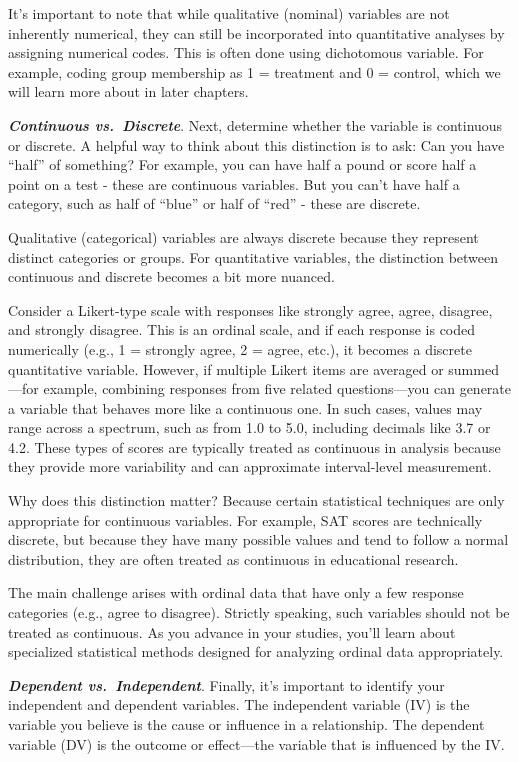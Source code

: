 \documentclass[
  letterpaper,
  DIV=11,
  numbers=noendperiod]{scrreprt}
\begin{document}
It's important to note that while qualitative (nominal) variables are
not inherently numerical, they can still be incorporated into
quantitative analyses by assigning numerical codes. This is often done
using dichotomous variable. For example, coding group membership as 1 =
treatment and 0 = control, which we will learn more about in later
chapters.

\textbf{\emph{Continuous vs.~Discrete}}. Next, determine whether the
variable is continuous or discrete. A helpful way to think about this
distinction is to ask: Can you have ``half'' of something? For example,
you can have half a pound or score half a point on a test - these are
continuous variables. But you can't have half a category, such as half
of ``blue'' or half of ``red'' - these are discrete.

Qualitative (categorical) variables are always discrete because they
represent distinct categories or groups. For quantitative variables, the
distinction between continuous and discrete becomes a bit more nuanced.

Consider a Likert-type scale with responses like strongly agree, agree,
disagree, and strongly disagree. This is an ordinal scale, and if each
response is coded numerically (e.g., 1 = strongly agree, 2 = agree,
etc.), it becomes a discrete quantitative variable. However, if multiple
Likert items are averaged or summed---for example, combining responses
from five related questions---you can generate a variable that behaves
more like a continuous one. In such cases, values may range across a
spectrum, such as from 1.0 to 5.0, including decimals like 3.7 or 4.2.
These types of scores are typically treated as continuous in analysis
because they provide more variability and can approximate interval-level
measurement.

Why does this distinction matter? Because certain statistical techniques
are only appropriate for continuous variables. For example, SAT scores
are technically discrete, but because they have many possible values and
tend to follow a normal distribution, they are often treated as
continuous in educational research.

The main challenge arises with ordinal data that have only a few
response categories (e.g., agree to disagree). Strictly speaking, such
variables should not be treated as continuous. As you advance in your
studies, you'll learn about specialized statistical methods designed for
analyzing ordinal data appropriately.

\textbf{\emph{Dependent vs.~Independent}}. Finally, it's important to
identify your independent and dependent variables. The independent
variable (IV) is the variable you believe is the cause or influence in a
relationship. The dependent variable (DV) is the outcome or effect---the
variable that is influenced by the IV.
\end{document}
